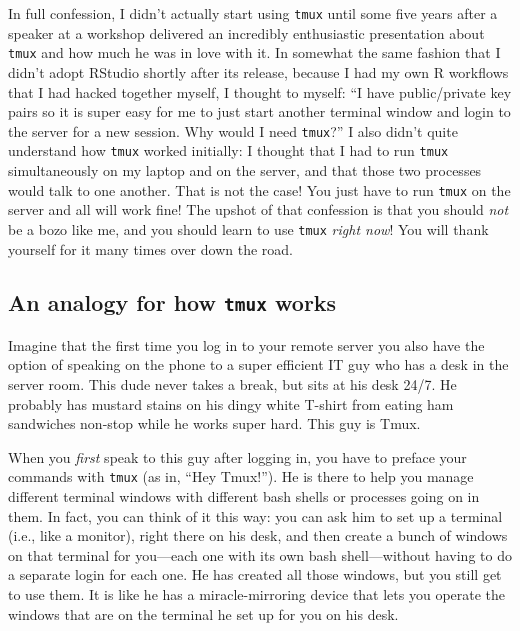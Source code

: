 \documentclass[]{krantz}
\begin{document}
In full confession, I didn't actually start using \texttt{tmux} until some
five years after a speaker at a workshop delivered an incredibly
enthusiastic presentation about \texttt{tmux} and how much he was in love
with it. In somewhat the same fashion that I didn't adopt RStudio shortly
after its release, because I had my own R workflows that I had hacked
together myself, I thought to myself: ``I have public/private key pairs
so it is super easy for me to just start another terminal window and login
to the server for a new session. Why would I need \texttt{tmux}?'' I also didn't
quite understand how \texttt{tmux} worked initially: I thought that I had to
run \texttt{tmux} simultaneously on my laptop and on the server, and that those
two processes would talk to one another. That is not the case! You
just have to run \texttt{tmux} on the server and all will work fine!
The upshot of that confession is that you should \emph{not} be a bozo like me,
and you should learn to use \texttt{tmux} \emph{right now}! You will thank yourself
for it many times over down the road.

\hypertarget{an-analogy-for-how-tmux-works}{%
\subsection{\texorpdfstring{An analogy for how \texttt{tmux} works}{An analogy for how tmux works}}\label{an-analogy-for-how-tmux-works}}

Imagine that the first time you log in to your remote server
you also have the option of speaking on the phone to a super
efficient IT guy who has a desk in the server room.
This dude never takes a break, but sits at his desk
24/7. He probably has mustard stains on his dingy white T-shirt
from eating ham sandwiches non-stop while he works super hard. This guy is Tmux.

When you \emph{first} speak to this guy after logging in, you have to preface your
commands with \texttt{tmux} (as in, ``Hey Tmux!''). He is there to help you
manage different terminal windows with different bash shells or
processes going on in them. In fact, you can think of it this way: you can
ask him to set up
a terminal (i.e., like a monitor), right there on his desk, and then create
a bunch of windows on that terminal for you---each
one with its own bash shell---without having to do a separate login for
each one. He has created all those windows, but you still get to use them.
It is like he has a miracle-mirroring device that lets you operate
the windows that are on the terminal he set up for you on his desk.
\end{document}
